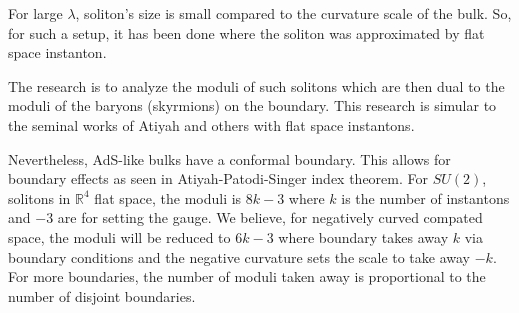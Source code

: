 \documentclass[12pt]{article}
\begin{document}
For large $\lambda$, soliton's size is small compared to the curvature scale of the bulk. 
So, for such a setup, it has been done where the soliton was approximated by flat space instanton.


The research is to analyze the moduli of such solitons which are then dual to the moduli of the baryons (skyrmions) on the boundary.
This research is simular to the seminal works of Atiyah and others with flat space instantons.

Nevertheless, AdS-like bulks have a conformal boundary. 
This allows for boundary effects as seen in Atiyah-Patodi-Singer index theorem.
For $SU(2)$, solitons in $\mathds{R}^4$ flat space, the moduli is $8k - 3$ where $k$ is the number of instantons and $-3$ are for setting the gauge.
We believe, for negatively curved compated space, the moduli will be reduced to $6k - 3$ where boundary takes away $k$ via boundary conditions and the negative curvature sets the scale to take away $-k$.
For more boundaries, the number of moduli taken away is proportional to the number of disjoint boundaries.


\end{document}

